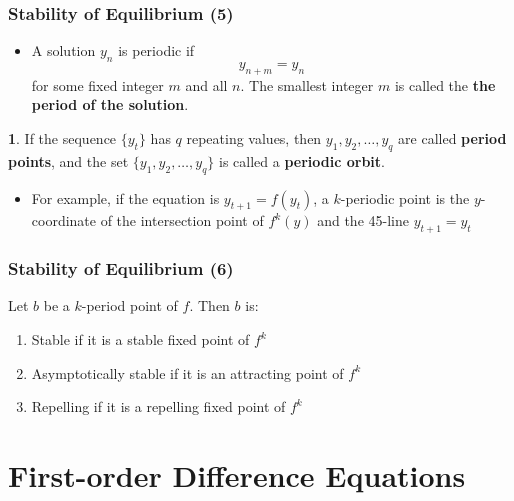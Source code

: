 \documentclass[10pt,usenames,dvipsnames]{beamer}
\theoremstyle{definition}
\newtheorem{definition}{\translate{Definition}}
\begin{document}
\begin{frame}[fragile]
\frametitle{Stability of Equilibrium (5)}
\begin{itemize}
	\item A solution $y_{n}$ is periodic if 
	\[
		y_{n+m} = y_{n}
	\]
	for some fixed integer $m$ and all $n$. The smallest integer $m$ is called the \textbf{the period of the solution}.
\end{itemize}
\begin{definition}
	If the sequence $\{y_{t}\}$ has $q$ repeating values, then $y_{1}, y_{2},\ldots, y_{q}$ are called \textbf{period points}, and the set $\{y_{1},y_{2},\ldots,y_{q}\}$ is called a \textbf{periodic orbit}.
\end{definition}

\begin{itemize}
	\item For example, if the equation is $y_{t+1} = f(y_{t})$, a $k$-periodic point is the $y$-coordinate of the intersection point of $f^{k}(y)$ and the 45\degree-line $y_{t+1} = y_{t}$
\end{itemize}

\end{frame}

\begin{frame}[fragile]
\frametitle{Stability of Equilibrium (6)}
\begin{theorem}
	Let $b$ be a $k$-period point of $f$. Then $b$ is:
	\begin{enumerate}
		\item Stable if it is a stable fixed point of $f^{k}$
		\item Asymptotically stable if it is an attracting point of $f^{k}$
		\item Repelling if it is a repelling fixed point of $f^{k}$
	\end{enumerate}
\end{theorem}
\end{frame}


\section{First-order Difference Equations}
\end{document}
